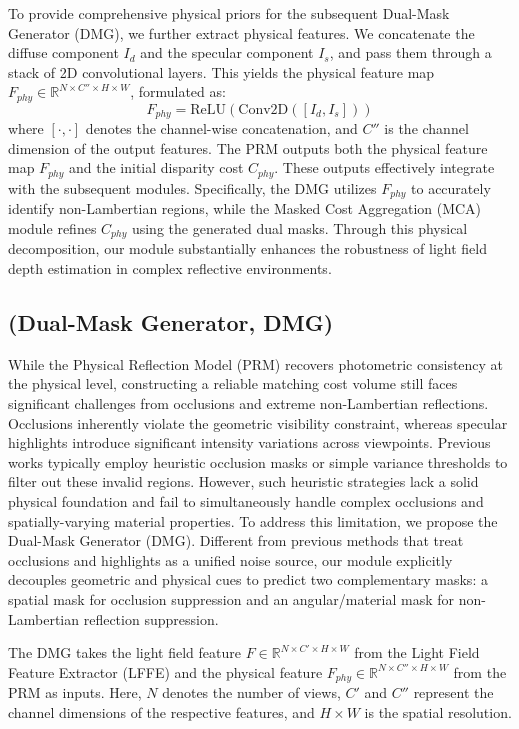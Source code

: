 To provide comprehensive physical priors for the subsequent Dual-Mask Generator (DMG), we further extract physical features. We concatenate the diffuse component $I_d$ and the specular component $I_s$, and pass them through a stack of 2D convolutional layers. This yields the physical feature map $F_{phy} \in \mathbb{R}^{N \times C'' \times H \times W}$, formulated as:
\begin{equation}
\label{eq:eq31}
F_{phy} = \text{ReLU}(\text{Conv2D}([I_d, I_s]))
\end{equation}
where $[\cdot, \cdot]$ denotes the channel-wise concatenation, and $C''$ is the channel dimension of the output features. The PRM outputs both the physical feature map $F_{phy}$ and the initial disparity cost $C_{phy}$. These outputs effectively integrate with the subsequent modules. Specifically, the DMG utilizes $F_{phy}$ to accurately identify non-Lambertian regions, while the Masked Cost Aggregation (MCA) module refines $C_{phy}$ using the generated dual masks. Through this physical decomposition, our module substantially enhances the robustness of light field depth estimation in complex reflective environments.

\subsection{(Dual-Mask Generator, DMG)}

While the Physical Reflection Model (PRM) recovers photometric consistency at the physical level, constructing a reliable matching cost volume still faces significant challenges from occlusions and extreme non-Lambertian reflections. Occlusions inherently violate the geometric visibility constraint, whereas specular highlights introduce significant intensity variations across viewpoints. Previous works typically employ heuristic occlusion masks or simple variance thresholds to filter out these invalid regions. However, such heuristic strategies lack a solid physical foundation and fail to simultaneously handle complex occlusions and spatially-varying material properties. To address this limitation, we propose the Dual-Mask Generator (DMG). Different from previous methods that treat occlusions and highlights as a unified noise source, our module explicitly decouples geometric and physical cues to predict two complementary masks: a spatial mask for occlusion suppression and an angular/material mask for non-Lambertian reflection suppression.

The DMG takes the light field feature $F \in \mathbb{R}^{N \times C' \times H \times W}$ from the Light Field Feature Extractor (LFFE) and the physical feature $F_{phy} \in \mathbb{R}^{N \times C'' \times H \times W}$ from the PRM as inputs. Here, $N$ denotes the number of views, $C'$ and $C''$ represent the channel dimensions of the respective features, and $H \times W$ is the spatial resolution. 

